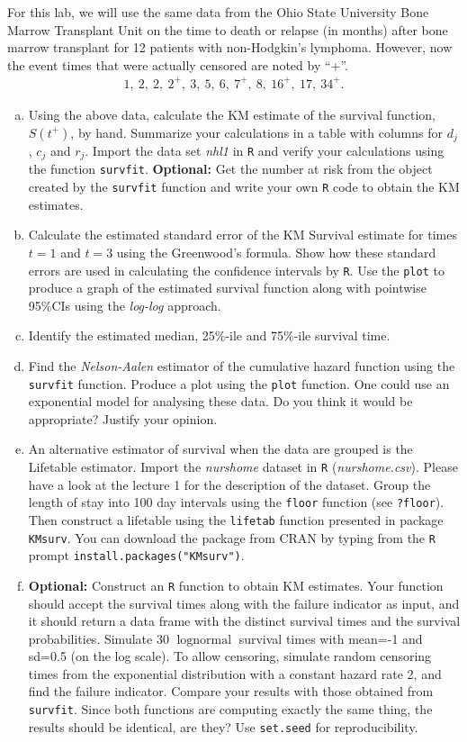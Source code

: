 For this lab, we will use the same data from the Ohio State University Bone Marrow 
Transplant Unit on the time to death or relapse (in months) after bone marrow 
transplant for 12 patients with non-Hodgkin's lymphoma. However, now the event 
times that were actually censored are noted by “+”.
\begin{align}
1,\ 2,\ 2,\ 2^{+},\
3,\ 5,\ 6,\ 7^{+},\ 8,\ 16^{+},\ 17,\ 34^{+}. \nonumber
\end{align}
\begin{enumerate}[(a)]
 \item  Using the above data, calculate the KM estimate of the survival function, $S(t^{+})$, by hand. Summarize your calculations in a table with columns for $d_{j}$, $c_{j}$ and $r_{j}$. Import the data set \emph{nhl1} in \verb|R| and verify your calculations using the function \verb|survfit|. \textbf{Optional:} Get the number at risk from the object created by the \verb|survfit| function and write your own \verb|R| code to obtain the KM estimates.
 \item Calculate the estimated standard error of the KM Survival estimate for times $t=1$ 
and $t=3$ using the Greenwood's formula. Show how these standard errors are used in calculating the confidence intervals by \verb|R|. Use the \verb|plot| to produce a graph of the estimated survival function along with pointwise 95\%CIs using the \emph{log-log} approach.

 \item Identify the estimated median, 25\%-ile and 75\%-ile survival time.
 \item Find the \emph{Nelson-Aalen} estimator of the cumulative hazard function using the \verb|survfit| function. Produce a plot using the \verb|plot| function. One could use an exponential model for analysing these data. Do you think it would be appropriate? Justify your opinion.
 \item An alternative estimator of survival when the data are grouped is the Lifetable estimator. Import the \emph{nurshome} dataset in \verb|R| (\emph{nurshome.csv}). Please have a look at the lecture 1 for the description of the dataset. Group the length of stay into 100 day intervals using the \verb|floor| function (see \verb|?floor|). Then construct a lifetable using the \verb|lifetab| function presented in package \verb|KMsurv|. You can download the package from CRAN by typing from the \verb|R| prompt \verb|install.packages("KMsurv")|. 
 \item \textbf{Optional:} Construct an \verb|R| function to obtain KM estimates. Your function should accept the survival times along with the failure indicator as input, and it should return a data frame with the distinct survival times and the survival probabilities. Simulate 30 $\operatorname{lognormal}$ survival times with mean=-1 and sd=0.5 (on the log scale). To allow censoring, simulate random censoring times from the exponential distribution with a constant hazard rate 2, and find the failure indicator. Compare your results with those obtained from \verb|survfit|. Since both functions are computing exactly the same thing, the results should be identical, are they?
 Use \verb|set.seed| for reproducibility.
\end{enumerate}